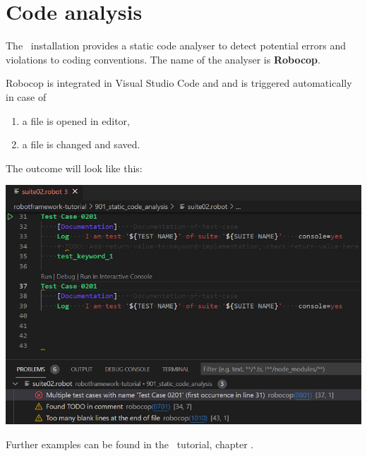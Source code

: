 %
%
%
\chapter{Code analysis}

The \rfw\ installation provides a static code analyser to detect potential errors and violations to coding conventions.
The name of the analyser is \textbf{Robocop}.

Robocop is integrated in Visual Studio Code and and is triggered automatically in case of
\begin{enumerate}
   \item a file is opened in editor,
   \item a file is changed and saved.
\end{enumerate}

The outcome will look like this:

\includegraphics{./include/graphics/code_analysis/Overview}

Further examples can be found in the \rfw\ tutorial, chapter .

\vspace{2ex}

